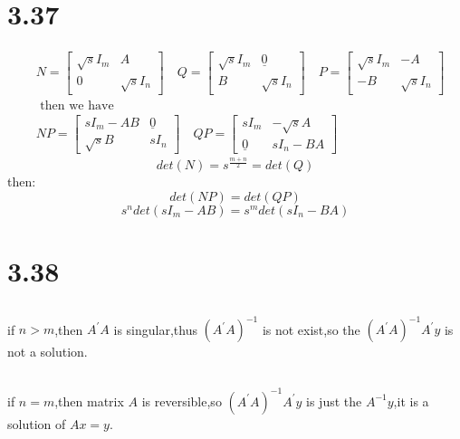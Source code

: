 \documentclass{article}
\newcommand{\rmnum}[1]{\romannumeral #1}
\begin{document}
\section*{3.37}
\[
\begin{aligned}
&N=\left[\begin{array}{cc}
\sqrt{s} I_{m} & A \\
0 & \sqrt{s} I_{n}
\end{array}\right] \quad Q=\left[\begin{array}{cc}
\sqrt{s} I_{m} & \underline{0} \\
B & \sqrt{s} I_{n}
\end{array}\right] \quad P=\left[\begin{array}{cc}
\sqrt{s} I_{m} & -A \\
-B & \sqrt{s} I_{n}
\end{array}\right]\\
&\text { then we have }\\
&N P=\left[\begin{array}{cc}
s I_{m}-A B & \underline{0} \\
\sqrt{s} B & s I_{n}
\end{array}\right] \quad Q P=\left[\begin{array}{cc}
s I_{m} & -\sqrt{s} A \\
\underline{0} & s I_{n}-B A
\end{array}\right]
\end{aligned}
\]
\[
det(N)=s^{\frac{m+n}{2}}=det(Q)    
\]
then:
\[
det(NP)=det(QP)
\]
\[s^ndet(sI_m-AB)=
s^mdet(sI_n-BA)
\]

\section*{3.38}
\subsection*{\rmnum{1}}

if $n>m$,then $A^{'}A$ is singular,thus $(A^{'}A)^{-1}$ is not exist,so the $(A^{'}A)^{-1}A^{'}y$ is not a solution.

\subsection*{\rmnum{2}}

if $n=m$,then matrix $A$ is reversible,so $(A^{'}A)^{-1}A^{'}y$ is just the $A^{-1}y$,it is a solution of $Ax=y$.
\end{document}
